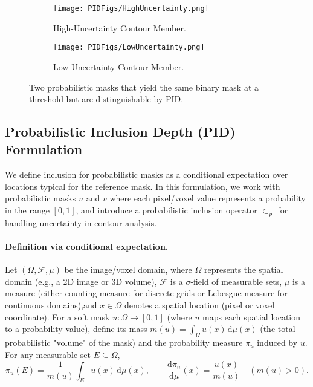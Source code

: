 \documentclass[review,journal]{vgtc}              %
\begin{document}
\begin{figure}[h!]
    \centering
    \begin{subfigure}[b]{0.45\textwidth}
        \centering
        \texttt{[image: PIDFigs/HighUncertainty.png]} 
        \caption{High-Uncertainty Contour Member.}
        \label{fig:high_uncertainty_mask}
    \end{subfigure}
    \hfill
    \begin{subfigure}[b]{0.45\textwidth}
        \centering
        \texttt{[image: PIDFigs/LowUncertainty.png]}
        \caption{Low-Uncertainty Contour Member.}
        \label{fig:low_uncertainty_mask}
    \end{subfigure}
    \caption{Two probabilistic masks that yield the same binary mask at a threshold but are distinguishable by PID.}
    \label{fig:prob_masks_uncertainty}
\end{figure}


\subsection{Probabilistic Inclusion Depth (PID) Formulation}
We define inclusion for probabilistic masks as a conditional expectation over locations typical for the reference mask. In this formulation, we work with probabilistic masks $u$ and $v$ where each pixel/voxel value represents a probability in the range $[0,1]$, and introduce a probabilistic inclusion operator $\subset_{\!p}$ for handling uncertainty in contour analysis.

\paragraph{Definition via conditional expectation.}
Let $(\Omega,\mathcal{F},\mu)$ be the image/voxel domain, where $\Omega$ represents the spatial domain (e.g., a 2D image or 3D volume), $\mathcal{F}$ is a $\sigma$-field of measurable sets, $\mu$ is a measure (either counting measure for discrete grids or Lebesgue measure for continuous domains),and $x \in \Omega$ denotes a spatial location (pixel or voxel coordinate).
For a soft mask $u:\Omega\!\to\![0,1]$ (where $u$ maps each spatial location to a probability value), define its mass
$m(u)=\int_\Omega u(x)\,\mathrm d\mu(x)$
(the total probabilistic "volume" of the mask) and the probability measure $\pi_u$ induced by $u$. For any measurable set $E \subseteq \Omega$,
\[
\pi_u(E)=\frac{1}{m(u)}\int_E u(x)\,\mathrm d\mu(x),\qquad 
\frac{\mathrm d\pi_u}{\mathrm d\mu}(x)=\frac{u(x)}{m(u)}\quad(m(u)>0).
\]
\end{document}
